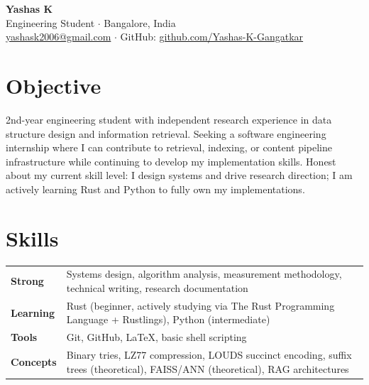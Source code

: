 \documentclass[11pt,a4paper]{article}
\begin{document}
\begin{center}
{\LARGE \textbf{Yashas K}}\\[3pt]
{\small Engineering Student $\cdot$ Bangalore, India\\[2pt]
\href{mailto:yashask2006@gmail.com}{yashask2006@gmail.com} $\cdot$
GitHub: \href{https://github.com/Yashas-K-Gangatkar}{github.com/Yashas-K-Gangatkar}}
\end{center}

\vspace{4pt}

\section*{Objective}

2nd-year engineering student with independent research experience in data structure design and information retrieval. Seeking a software engineering internship where I can contribute to retrieval, indexing, or content pipeline infrastructure while continuing to develop my implementation skills. Honest about my current skill level: I design systems and drive research direction; I am actively learning Rust and Python to fully own my implementations.

\section*{Skills}

\begin{tabularx}{\textwidth}{@{}l X@{}}
\textbf{Strong} & Systems design, algorithm analysis, measurement methodology, technical writing, research documentation \\
\textbf{Learning} & Rust (beginner, actively studying via The Rust Programming Language + Rustlings), Python (intermediate) \\
\textbf{Tools} & Git, GitHub, LaTeX, basic shell scripting \\
\textbf{Concepts} & Binary tries, LZ77 compression, LOUDS succinct encoding, suffix trees (theoretical), FAISS/ANN (theoretical), RAG architectures \\
\end{tabularx}
\end{document}
